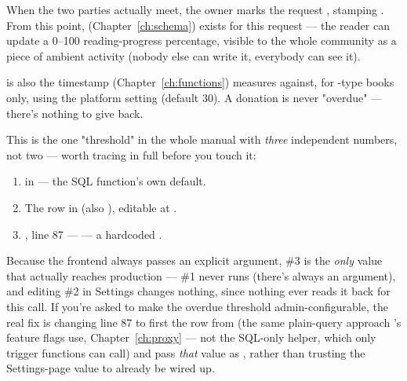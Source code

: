When the two parties actually meet, the owner marks the request , stamping . From this point,  (Chapter~\ref{ch:schema}) exists for this request — the reader can update a 0--100 reading-progress percentage, visible to the whole community as a piece of ambient activity (nobody else can write it, everybody can see it).

\begin{olknote}
 is also the timestamp  (Chapter~\ref{ch:functions}) measures against, for -type books only, using the  platform setting (default 30). A donation is never "overdue" — there's nothing to give back.
\end{olknote}

\begin{olkhowto}
This is the one "threshold" in the whole manual with \emph{three} independent numbers, not two — worth tracing in full before you touch it:
\begin{enumerate}
  \item {} in  — the SQL function's own default.
  \item The  row in  (also ), editable at .
  \item {}, line 87 —  — a hardcoded .
\end{enumerate}
Because the frontend always passes an explicit argument, \#3 is the \emph{only} value that actually reaches production — \#1 never runs (there's always an argument), and editing \#2 in Settings changes nothing, since nothing ever reads it back for this call. If you're asked to make the overdue threshold admin-configurable, the real fix is changing line 87 to first  the  row from  (the same plain-query approach 's feature flags use, Chapter~\ref{ch:proxy} — not the SQL-only  helper, which only trigger functions can call) and pass \emph{that} value as , rather than trusting the Settings-page value to already be wired up.
\end{olkhowto}

